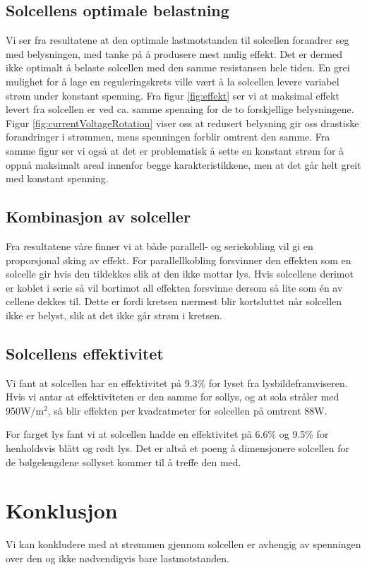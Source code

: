 \documentclass[a4paper,11pt, twocolumn]{article}
\begin{document}
\subsection{Solcellens optimale belastning}
Vi ser fra resultatene at den optimale lastmotstanden til solcellen forandrer seg med belysningen, med tanke på å produsere mest mulig effekt. Det er dermed ikke optimalt å belaste solcellen med den samme resistansen hele tiden. En grei mulighet for å lage en reguleringskrets ville vært å la solcellen levere variabel strøm under konstant spenning. Fra figur \ref{fig:effekt} ser vi at maksimal effekt levert fra solcellen er ved ca. samme spenning for de to forskjellige belysningene. Figur \ref{fig:currentVoltageRotation} viser oss at redusert belysning gir oss drastiske forandringer i strømmen, mens spenningen forblir omtrent den samme. Fra samme figur ser vi også at det er problematisk å sette en konstant strøm for å oppnå maksimalt areal innenfor begge karakteristikkene, men at det går helt greit med konstant spenning.

\subsection{Kombinasjon av solceller}
Fra resultatene våre finner vi at både parallell- og seriekobling vil gi en proporsjonal øking av effekt. For parallellkobling forsvinner den effekten som en solcelle gir hvis den tildekkes slik at den ikke mottar lys. Hvis solcellene derimot er koblet i serie så vil bortimot all effekten forsvinne dersom så lite som \'en av cellene dekkes til. Dette er fordi kretsen nærmest blir kortsluttet når solcellen ikke er belyst, slik at det ikke går strøm i kretsen.

\subsection{Solcellens effektivitet} 
Vi fant at solcellen har en effektivitet på 9.3\% for lyset fra lysbildeframviseren. Hvis vi antar at effektiviteten er den samme for sollys, og at sola stråler med 950W/m$^2$, så blir effekten per kvadratmeter for solcellen på omtrent 88W.

For farget lys fant vi at solcellen hadde en effektivitet på 6.6\% og 9.5\% for henholdsvis blått og rødt lys. Det er altså et poeng å dimensjonere solcellen for de bølgelengdene sollyset kommer til å treffe den med. 

\section{Konklusjon}
Vi kan konkludere med at strømmen gjennom solcellen er avhengig av spenningen over den og ikke nødvendigvis bare lastmotstanden. 
\end{document}
